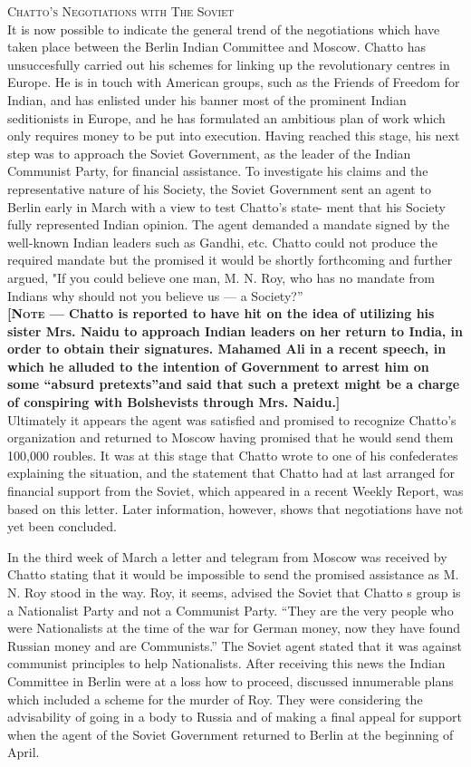 \textsc{Chatto’s Negotiations with The Soviet}\\

It is now possible to indicate the general trend of the negotiations which have taken place between the Berlin Indian Committee and Moscow. Chatto has unsuccesfully carried out his schemes for linking up the revolutionary centres in Europe. He is in touch with American groups, such as the Friends of Freedom for Indian, and has enlisted under his banner most of the prominent Indian seditionists in Europe, and he has formulated an ambitious plan of work which only requires money to be put into execution. Having reached this stage, his next step was to approach the Soviet Government, as the leader of the Indian Communist Party, for financial assistance. To investigate his claims and the representative nature of his Society, the Soviet Government sent an agent to Berlin early in March with a view to test Chatto’s state- 
ment that his Society fully represented Indian opinion. The agent demanded a mandate signed by the well-known Indian leaders such as Gandhi, etc. Chatto could not produce the required mandate but the promised it would be shortly forthcoming and further argued, "If you could believe one man, M. N. Roy, who has no mandate from Indians why should not you believe us — a Society?” \\

\textbf{[\textsc{Note} — Chatto is reported to have hit on the idea of utilizing his sister Mrs. Naidu to approach Indian leaders on her return to India, in order to obtain their signatures. Mahamed Ali in a recent speech, in which he alluded to the intention of Government to arrest him on some “absurd pretexts”and said that such a pretext might be a charge of conspiring with Bolshevists through Mrs. Naidu.] }\\

Ultimately it appears the agent was satisfied and promised to recognize Chatto’s organization and returned to Moscow having promised that he would send them 100,000 roubles. It was at this stage that Chatto wrote to one of his confederates explaining the situation, and the statement that Chatto had at last arranged for financial support from the Soviet, which appeared in a recent Weekly Report, was based on this letter. Later information, however, shows that negotiations have not yet been concluded. 

In the third week of March a letter and telegram from Moscow was received by Chatto stating that it would be impossible to send the promised assistance as M. N. Roy stood in the way. Roy, it seems, advised the Soviet that Chatto s group is a Nationalist Party and not a Communist 
Party. “They are the very people who were Nationalists at the time of the war for German money, now they have found Russian money and are Communists.” The Soviet agent stated that it was against communist principles to help Nationalists. After receiving this news the Indian Committee in Berlin were at a loss how to proceed, discussed innumerable plans which included a scheme for the murder of Roy. They were considering the advisability of going in a body to Russia and of making a final appeal for support when the agent of the Soviet Government returned to Berlin at the beginning of April. 


